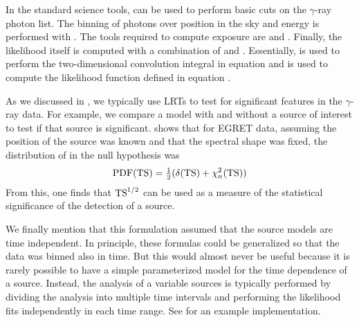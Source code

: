 In the standard \fermi science tools, \gtbin can be used to perform
basic cuts on the $\gamma$-ray photon list.  The binning of photons
over position in the sky and energy is performed with \gtbin.  The tools
required to compute exposure are \gtltcube and \gtexpcubetwo. Finally,
the likelihood itself is computed with a combination of \gtsrcmaps and
\gtlike.  Essentially, \gtsrcmaps is used to perform the two-dimensional
convolution integral in equation  and
\gtlike is used to compute the likelihood function defined in equation
.

As we discussed in ,
we typically use \acp{LRT} to test for significant features in
the $\gamma$-ray data.  For example, we compare a model with and
without a source of interest to test if that source is significant.
\cite{mattox_1996a_likelihood-analysis} shows that for \ac{EGRET} data,
assuming the position of the source was known and that the spectral shape was
fixed, the distribution of \ts in the null hypothesis was
\begin{equation}
  \text{PDF}(\mathrm{TS}) = \tfrac{1}{2} (\delta(\mathrm{TS}) + \chi^2_n(\mathrm{TS}))
\end{equation}
From this, one finds that $\mathrm{TS}^{1/2}$ can be used as a measure of the
statistical significance of the detection of a source.

We finally mention that this formulation assumed that the source models
are time independent.  In principle, these formulas could be generalized
so that the data was binned also in time. But this would almost never be
useful because it is rarely possible to have a simple parameterized model
for the time dependence of a source. Instead, the analysis of a variable
sources is typically performed by dividing the analysis into multiple time
intervals and performing the likelihood fits independently in each time
range. See \cite{nolan_2012_fermi-large} for an example implementation.
